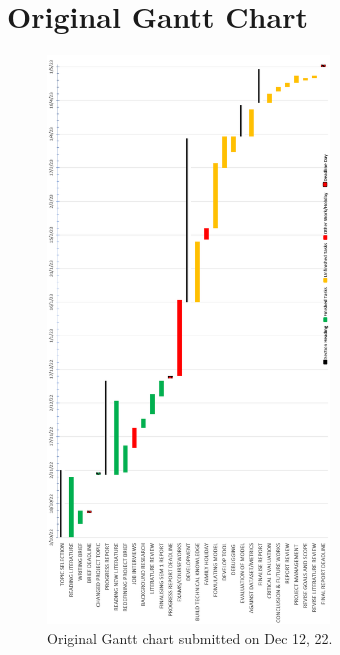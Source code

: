 \chapter{Original Gantt Chart}


\begin{figure}[!htb]
    \includegraphics[width=7.5cm,center]{Figures/oldGantt.png}
    \caption{Original Gantt chart submitted on Dec 12, 22.}
    \label{Figure:OriginalGantt}
\end{figure}